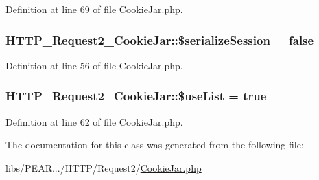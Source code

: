 Definition at line 69 of file Cookie\-Jar.\-php.

\hypertarget{classHTTP__Request2__CookieJar_ae5e881693fdcfe8cdc23966be0d8a218}{
\subsubsection[{\$serialize\-Session}]{\setlength{\rightskip}{0pt plus 5cm}H\-T\-T\-P\-\_\-\-Request2\-\_\-\-Cookie\-Jar\-::\$serialize\-Session = false\hspace{0.3cm}{\ttfamily [protected]}}}\label{classHTTP__Request2__CookieJar_ae5e881693fdcfe8cdc23966be0d8a218}


Definition at line 56 of file Cookie\-Jar.\-php.

\hypertarget{classHTTP__Request2__CookieJar_a931db790fefc72638f7220fc45f16a55}{
\subsubsection[{\$use\-List}]{\setlength{\rightskip}{0pt plus 5cm}H\-T\-T\-P\-\_\-\-Request2\-\_\-\-Cookie\-Jar\-::\$use\-List = true\hspace{0.3cm}{\ttfamily [protected]}}}\label{classHTTP__Request2__CookieJar_a931db790fefc72638f7220fc45f16a55}


Definition at line 62 of file Cookie\-Jar.\-php.



The documentation for this class was generated from the following file\-:\begin{DoxyCompactItemize}
\item 
libs/\-P\-E\-A\-R.../\-H\-T\-T\-P/\-Request2/\hyperlink{CookieJar_8php}{Cookie\-Jar.\-php}\end{DoxyCompactItemize}
